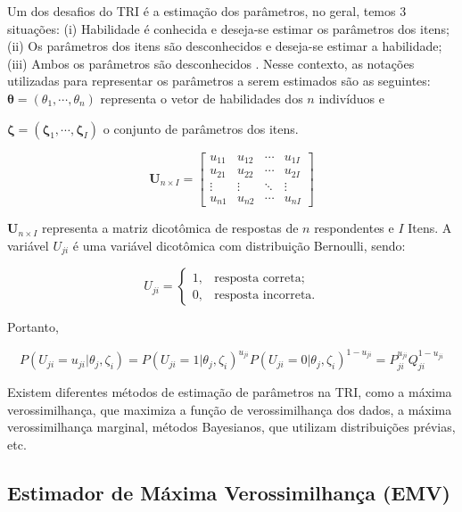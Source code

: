 Um dos desafios do TRI é a estimação dos parâmetros, no geral, temos 3 situações:  (i) Habilidade é conhecida e deseja-se estimar os parâmetros dos itens; (ii) Os parâmetros dos itens são desconhecidos e deseja-se estimar a habilidade; (iii) Ambos os parâmetros são desconhecidos \cite{de2000teoria}.  Nesse contexto, as notações utilizadas para representar os parâmetros a serem estimados são as seguintes:\\


\noindent $ \boldsymbol{\theta} = (\theta_1, \cdots, \theta_n) $  representa o vetor de habilidades dos $n$ indivíduos e

\noindent $ \boldsymbol{\zeta} = (\boldsymbol{\zeta}_1, \cdots, \boldsymbol{\zeta}_I) $ o conjunto de parâmetros dos itens.

\[ \textbf{U}_{n\times I} =  
\begin{bmatrix}
	u_{11} & u_{12} & \cdots & u_{1I} \\
	u_{21} & u_{22} & \cdots & u_{2I} \\
	\vdots & \vdots & \ddots & \vdots\\
	u_{n1} & u_{n2} & \cdots & u_{nI}
\end{bmatrix}
\]

\noindent $\textbf{U}_{n\times I}$ representa a matriz dicotômica de respostas de $ n $ respondentes e $ I $ Itens. A variável $U_{ji}$ é uma variável dicotômica com distribuição Bernoulli, sendo:

\[U_{ji} =    \begin{cases}
	
	  1, & \mbox{resposta correta;}  \\
	
	  0, & \mbox{resposta incorreta.}
	
\end{cases}
\]

Portanto,  

\begin{equation} \label{eq:bern}
P(U_{ji} = u_{ji}|\theta_j, \zeta_i) = P(U_{ji} = 1|\theta_j, \zeta_i)^{u_{ji}}
P(U_{ji} = 0|\theta_j, \zeta_i)^{1 - u_{ji}} = P_{ji}^{u_{ji}}Q_{ji}^{1-u_{ji}}
\end{equation}

Existem diferentes métodos de estimação de parâmetros na TRI, como a máxima verossimilhança, que maximiza a função de verossimilhança dos dados, a máxima verossimilhança marginal, métodos Bayesianos, que utilizam distribuições prévias, etc.

\subsection{Estimador de Máxima Verossimilhança (EMV)}


